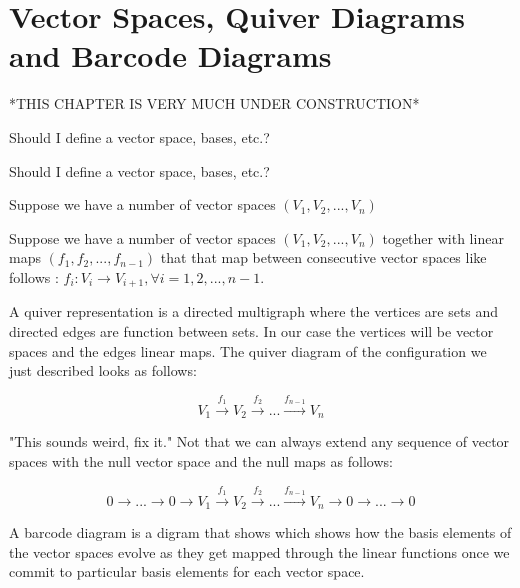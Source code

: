 






\section{Vector Spaces, Quiver Diagrams and Barcode Diagrams}

*THIS CHAPTER IS VERY MUCH UNDER CONSTRUCTION*

Should I define a vector space, bases, etc.?

Should I define a vector space, bases, etc.?


Suppose we have a number of vector spaces $(V_1, V_2, ...,V_n)$

Suppose we have a number of vector spaces $(V_1, V_2, ...,V_n)$ together with linear maps $(f_1, f_2, ...,f_{n-1})$ that that map between consecutive vector spaces like follows : $f_i: V_i \to V_{i+1}, \forall i = 1, 2, ..., n -1$. 

A quiver representation is a directed multigraph where the vertices are sets and directed edges are function between sets. In our case the vertices will be vector spaces and the edges linear maps. The quiver diagram of the configuration we just described looks as follows:

$$V_1 \overset{f_1}{\longrightarrow} V_2 \overset{f_2}{\longrightarrow} ... \overset{f_{n-1}}{\longrightarrow} V_n  $$


"This sounds weird, fix it."
Not that we can always extend any sequence of vector spaces with the null vector space and the null maps as follows:

$$ 0 \longrightarrow ... \longrightarrow 0 \longrightarrow V_1 \overset{f_1}{\longrightarrow} V_2 \overset{f_2}{\longrightarrow} ... \overset{f_{n-1}}{\longrightarrow} V_n  \longrightarrow 0 \longrightarrow ... \longrightarrow 0$$

A barcode diagram is a digram that shows which shows how the basis elements of the vector spaces evolve as they get mapped through the linear functions once we commit to particular basis elements for each vector space.

